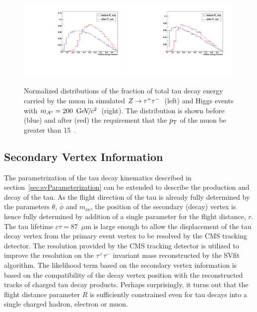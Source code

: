 \begin{figure}[t]
\begin{center}
\includegraphics*[width=0.49\textwidth]{svfit_chapter/figures/scuplting_Ztautau_powheg_muon.pdf}
\includegraphics*[width=0.49\textwidth]{svfit_chapter/figures/scuplting_A200_muon.pdf}
\caption[Effect of the visible \pt requirements for $Z$ and Higgs
events]{\captiontext Normalized distributions of the fraction of total tau decay
energy carried by the muon in simulated $Z\to\tau^+\tau^-$~(left) and Higgs events with
\mbox{$m_{A^0} = 200~{\,\text{Ge\hspace{-.08em}V\hspace{-0.16em}/\hspace{-0.08em}}c^\text{2}}$}~(right).   The distribution is shown before (blue) and
after (red) the requirement that the $p_{\mathrm{T}}$ of the muon be greater than
15~\GeVc.} \label{fig:ptBalancePtVisCutsCompareMasses}
\end{center}
\end{figure} 

\subsection{Secondary Vertex Information} 

The parametrization of the tau decay kinematics described in
section~\ref{sec:svParameterization} can be extended to describe the production
and decay of the tau.  As the flight direction of the tau is already fully
determined by the parameters $\theta$, $\overline{\phi}$ and $m_{\nu\nu}$, the
position of the secondary (decay) vertex is hence fully determined by addition
of a single parameter for the flight distance, $r$.  The tau lifetime $c\tau =
87$~$\mu$m is large enough to allow the displacement of the tau decay vertex
from the primary event vertex to be resolved by the CMS tracking detector.  The
resolution provided by the CMS tracking detector is utilized to improve the
resolution on the $\tau^{+} \tau^{-}$ invariant mass reconstructed by the SVfit
algorithm.  The likelihood term based on the secondary vertex information is
based on the compatibility of the decay vertex position with the reconstructed
tracks of charged tau decay products.  Perhaps surprisingly, it turns out that
the flight distance parameter $R$ is sufficiently constrained even for tau
decays into a single charged hadron, electron or muon.

